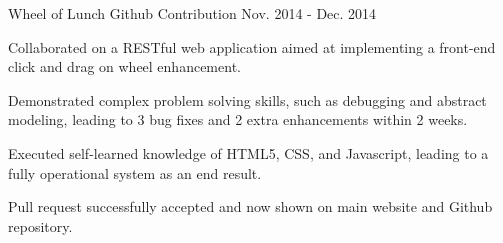 \begin{cventries}
  \cvtechentry
    {Wheel of Lunch Github Contribution} %
    {} %
    {} %
    {Nov. 2014 - Dec. 2014} %
    {
      \begin{cvitems} %
        \item {Collaborated on a RESTful web application aimed at implementing a front-end click and drag on wheel enhancement.}
        \item {Demonstrated complex problem solving skills, such as debugging and abstract modeling, leading to 3 bug fixes and 2 extra enhancements within 2 weeks.}
        \item {Executed self-learned knowledge of HTML5, CSS, and Javascript, leading to a fully operational system as an end result.}
        \item {Pull request successfully accepted and now shown on main website and Github repository.}
      \end{cvitems}
    }
\end{cventries}
